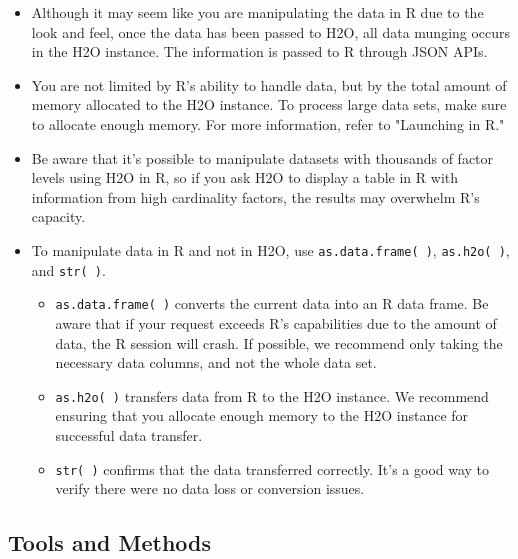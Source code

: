 \documentclass[11pt]{article}
\begin{document}
\begin{enumerate}
\begin{itemize}
\item Although it may seem like you are manipulating the data in R due to the look and feel, once the data has been passed to H2O, all data munging occurs in the H2O instance. The information is passed to R through JSON APIs. 
\item You are not limited by R’s ability to handle data, but by the total amount of memory allocated to the H2O instance. To process large data sets, make sure to allocate enough memory. For more information, refer to "Launching in R." 
\item Be aware that it’s possible to manipulate datasets with thousands of factor levels using H2O in R, so if you ask H2O to display a table in R with information from high cardinality factors, the results may overwhelm R’s capacity. 
\item To manipulate data in R and not in H2O, use {\texttt{as.data.frame( )}}, {\texttt{as.h2o( )}}, and {\texttt{str( )}}. \begin{itemize}
\item {\texttt{as.data.frame( )}} converts the current data into an R data frame. Be aware that if your request exceeds R’s capabilities due to the amount of data, the R session will crash. If possible, we recommend only taking the necessary data columns, and not the whole data set. 
\item {\texttt{as.h2o( )}} transfers data from R to the H2O instance. We recommend ensuring that you allocate enough memory to the H2O instance for successful data transfer.
\item {\texttt{str( )}} confirms that the data transferred correctly. It’s a good way to verify there were no data loss or conversion issues. 
\end{itemize}\end{itemize}

\subsection{Tools and Methods}


\end{enumerate}
\end{document}
